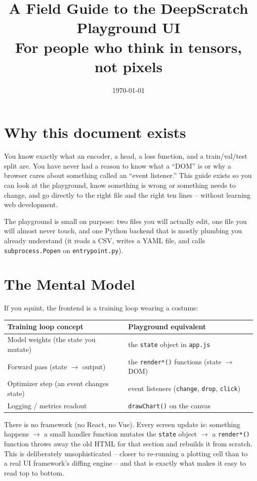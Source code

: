 \documentclass[11pt]{article}
\title{A Field Guide to the DeepScratch Playground UI\\
\large For people who think in tensors, not pixels}
\author{}
\date{\today}
\begin{document}
\maketitle
\tableofcontents

\section{Why this document exists}

You know exactly what an encoder, a head, a loss function, and a train/val/test
split are. You have never had a reason to know what a ``DOM'' is or why a
browser cares about something called an ``event listener.'' This guide exists
so you can look at the playground, know something is wrong or something needs
to change, and go directly to the right file and the right ten lines --
without learning web development.

The playground is small on purpose: two files you will actually edit, one
file you will almost never touch, and one Python backend that is mostly
plumbing you already understand (it reads a CSV, writes a YAML file, and
calls \lstinline{subprocess.Popen} on \lstinline{entrypoint.py}).

\section{The Mental Model}

If you squint, the frontend is a training loop wearing a costume:

\begin{center}
\begin{tabular}{@{}ll@{}}
\toprule
\textbf{Training loop concept} & \textbf{Playground equivalent} \\
\midrule
Model weights (the state you mutate) & the \lstinline{state} object in \lstinline{app.js} \\
Forward pass (state $\to$ output) & the \lstinline{render*()} functions (state $\to$ DOM) \\
Optimizer step (an event changes state) & event listeners (\lstinline{change}, \lstinline{drop}, \lstinline{click}) \\
Logging / metrics readout & \lstinline{drawChart()} on the canvas \\
\bottomrule
\end{tabular}
\end{center}

There is no framework (no React, no Vue). Every screen update is: something
happens $\to$ a small handler function mutates the \lstinline{state} object
$\to$ a \lstinline{render*()} function throws away the old HTML for that
section and rebuilds it from scratch. This is deliberately unsophisticated --
closer to re-running a plotting cell than to a real UI framework's diffing
engine -- and that is exactly what makes it easy to read top to bottom.
\end{document}
